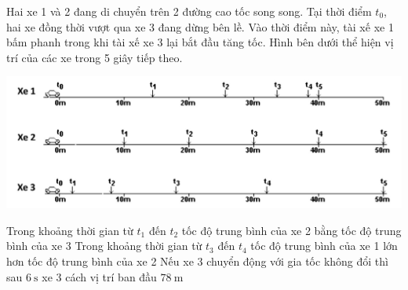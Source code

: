 \begin{ex}
	Hai xe 1 và 2 đang di chuyển trên 2 đường cao tốc song song. Tại thời điểm $t_0$, hai xe đồng thời vượt qua xe 3 đang dừng bên lề. Vào thời điểm này, tài xế xe 1 bấm phanh trong khi tài xế xe 3 lại bắt đầu tăng tốc. Hình bên dưới thể hiện vị trí của các xe trong 5 giây tiếp theo.
	\begin{center}
		\includegraphics[width=0.7\linewidth]{../figs/D10-2-10}
	\end{center}
	{\True Trong khoảng thời gian từ $t_1$ đến $t_2$ tốc độ trung bình của xe 2 bằng tốc độ trung bình của xe 3}
	{Trong khoảng thời gian từ $t_3$ đến $t_4$ tốc độ trung bình của xe 1 lớn hơn tốc độ trung bình của xe 2}
	{Nếu xe 3 chuyển động với gia tốc không đổi thì sau $\SI{6}{\second}$ xe 3 cách vị trí ban đầu $\SI{78}{\meter}$}
\end{ex}
